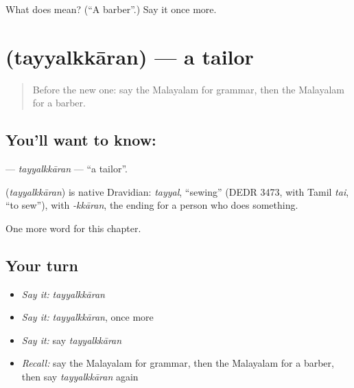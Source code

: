 \begin{tcolorbox}[breakable,colback=teal!4,colframe=teal!35!black,title={Before you move on}]
What does  mean? (\textquotedblleft{}A barber\textquotedblright{}.) Say it once more.
\end{tcolorbox}
\section[\texorpdfstring{\ml{തയ്യൽക്കാരൻ} (tayyalkkāran)}{തയ്യൽക്കാരൻ (tayyalkkāran)}]{ (tayyalkkāran) — a tailor}

\label{lesson:ML-C222-tayyalkkaran}



\begin{quote}
Before the new one: say the Malayalam for grammar, then the Malayalam for a barber.
\end{quote}

\subsection*{You'll want to know: }
\textbf{} — \emph{tayyalkkāran} — \textquotedblleft{}a tailor\textquotedblright{}.

\begin{cousinweb}
\textbf{} (\emph{tayyalkkāran}) is native Dravidian: \emph{tayyal}, \textquotedblleft{}sewing\textquotedblright{} (DEDR 3473, with Tamil \emph{tai}, \textquotedblleft{}to sew\textquotedblright{}), with \emph{-kkāran}, the ending for a person who does something.
\end{cousinweb}

\begin{grammarlens}[title={What you've built}]
One more word for this chapter.
\end{grammarlens}

\subsection*{Your turn}
\begin{itemize}
\raggedright
  \item \emph{Say it:} \emph{tayyalkkāran}
  \item \emph{Say it:} \emph{tayyalkkāran}, once more
  \item \emph{Say it:} say \emph{tayyalkkāran}
  \item \emph{Recall:} say the Malayalam for grammar, then the Malayalam for a barber, then say \emph{tayyalkkāran} again
\end{itemize}

